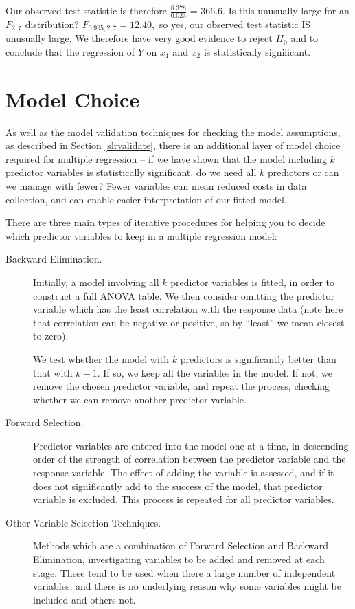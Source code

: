 \documentclass[12pt,a4paper,openany,twoside]{report}
\theoremstyle{definition}
\theoremstyle{remark}
\theoremstyle{plain}
\theoremstyle{definition}
\theoremstyle{definition}
\theoremstyle{definition}
\theoremstyle{remark}
\begin{document}
Our observed test statistic is therefore \(\frac{8.378}{0.023}\) =
366.6.
Is this unusually large for an \(F_{2,7}\) distribution?
\(F_{0.995, 2,7} = 12.40,\) so yes, our observed test statistic IS
unusually large. We therefore have very good evidence to reject
\(H_{0}\) and to conclude that the regression of \(Y\) on
\(x_{1}\) and \(x_{2}\) is statistically significant.

\section{Model Choice}

As well as the model validation techniques for checking the model
assumptions, as described in Section \ref{slrvalidate}, there is an additional layer
of model choice required for multiple regression -- if we have shown
that the model including \(k\) predictor variables is statistically
significant, do we need all \(k\) predictors or can we manage with fewer?
Fewer variables can mean reduced costs in data collection, and can
enable easier interpretation of our fitted model.

There are three main types of iterative procedures for helping you to
decide which predictor variables to keep in a multiple regression model:

\begin{description}
\item[Backward Elimination.] Initially, a model involving all $k$ predictor variables is fitted, in
order to construct a full ANOVA table. We then consider omitting the
predictor variable which has the least correlation with the response
data (note here that correlation can be negative or positive, so by
``least'' we mean closest to zero). 

We test whether the model with $k$ predictors is significantly better than
that with $k-1$. If so, we keep all the variables in the model. If not, we
remove the chosen predictor variable, and repeat the process, checking
whether we can remove another predictor variable.

\item[Forward Selection.] Predictor variables are entered into the model one at a time, in
descending order of the strength of correlation between the predictor
variable and the response variable. The effect of adding the variable
is assessed, and if it does not significantly add to the success of the
model, that predictor variable is excluded. This process is repeated for
all predictor variables.

\item[Other Variable Selection Techniques.] Methods which are a combination of Forward Selection and Backward
Elimination, investigating variables to be added and removed at each
stage. These tend to be used when there a large number of independent
variables, and there is no underlying reason why some variables might be
included and others not.
\end{description}
\end{document}
